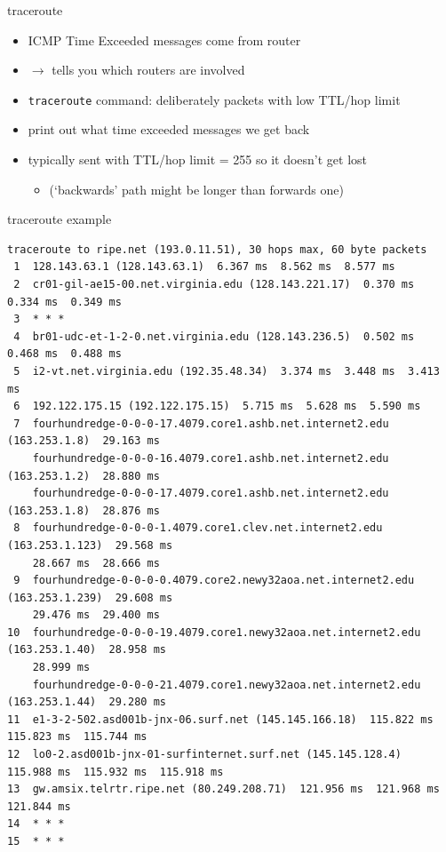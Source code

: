 
\begin{frame}{traceroute}
    \begin{itemize}
    \item ICMP Time Exceeded messages come from router
    \item $\rightarrow$ tells you which routers are involved
    \vspace{.5cm}
    \item<2-> \texttt{traceroute} command: deliberately packets with low TTL/hop limit
    \item<2-> print out what time exceeded messages we get back
    \item<2-> typically sent with TTL/hop limit = 255 so it doesn't get lost
        \begin{itemize}
        \item (`backwards' path might be longer than forwards one)
        \end{itemize}
    \end{itemize}
\end{frame}

\begin{frame}[fragile]{traceroute example}
\begin{Verbatim}[fontsize=\fontsize{8}{9}\selectfont]
traceroute to ripe.net (193.0.11.51), 30 hops max, 60 byte packets
 1  128.143.63.1 (128.143.63.1)  6.367 ms  8.562 ms  8.577 ms
 2  cr01-gil-ae15-00.net.virginia.edu (128.143.221.17)  0.370 ms  0.334 ms  0.349 ms
 3  * * *
 4  br01-udc-et-1-2-0.net.virginia.edu (128.143.236.5)  0.502 ms  0.468 ms  0.488 ms
 5  i2-vt.net.virginia.edu (192.35.48.34)  3.374 ms  3.448 ms  3.413 ms
 6  192.122.175.15 (192.122.175.15)  5.715 ms  5.628 ms  5.590 ms
 7  fourhundredge-0-0-0-17.4079.core1.ashb.net.internet2.edu (163.253.1.8)  29.163 ms
    fourhundredge-0-0-0-16.4079.core1.ashb.net.internet2.edu (163.253.1.2)  28.880 ms
    fourhundredge-0-0-0-17.4079.core1.ashb.net.internet2.edu (163.253.1.8)  28.876 ms
 8  fourhundredge-0-0-0-1.4079.core1.clev.net.internet2.edu (163.253.1.123)  29.568 ms 
    28.667 ms  28.666 ms
 9  fourhundredge-0-0-0-0.4079.core2.newy32aoa.net.internet2.edu (163.253.1.239)  29.608 ms 
    29.476 ms  29.400 ms
10  fourhundredge-0-0-0-19.4079.core1.newy32aoa.net.internet2.edu (163.253.1.40)  28.958 ms 
    28.999 ms 
    fourhundredge-0-0-0-21.4079.core1.newy32aoa.net.internet2.edu (163.253.1.44)  29.280 ms
11  e1-3-2-502.asd001b-jnx-06.surf.net (145.145.166.18)  115.822 ms  115.823 ms  115.744 ms
12  lo0-2.asd001b-jnx-01-surfinternet.surf.net (145.145.128.4)  115.988 ms  115.932 ms  115.918 ms
13  gw.amsix.telrtr.ripe.net (80.249.208.71)  121.956 ms  121.968 ms  121.844 ms
14  * * *
15  * * *
\end{Verbatim}
\end{frame}

